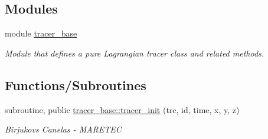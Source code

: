 \subsection*{Modules}
\begin{DoxyCompactItemize}
\item 
module \mbox{\hyperlink{namespacetracer__base}{tracer\+\_\+base}}
\begin{DoxyCompactList}\small\item\em Module that defines a pure Lagrangian tracer class and related methods. \end{DoxyCompactList}\end{DoxyCompactItemize}
\subsection*{Functions/\+Subroutines}
\begin{DoxyCompactItemize}
\item 
subroutine, public \mbox{\hyperlink{namespacetracer__base_ac4eda3326a346308d0a7fb42b4af9cb9}{tracer\+\_\+base\+::tracer\+\_\+init}} (trc, id, time, x, y, z)
\begin{DoxyCompactList}\small\item\em Birjukovs Canelas -\/ M\+A\+R\+E\+T\+EC \end{DoxyCompactList}\end{DoxyCompactItemize}

